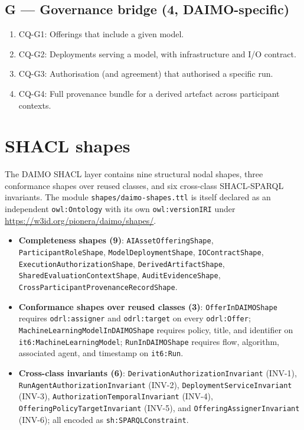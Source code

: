 \documentclass[Afour,sagev,times]{sagej}
\newcommand{\code}[1]{\texttt{#1}}
\newcommand{\cq}[1]{\textsf{#1}}
\begin{document}
\subsection*{G --- Governance bridge (4, DAIMO-specific)}
\begin{enumerate}[label=\arabic*., leftmargin=*]
\item \cq{CQ-G1}: Offerings that include a given model.
\item \cq{CQ-G2}: Deployments serving a model, with infrastructure and I/O contract.
\item \cq{CQ-G3}: Authorisation (and agreement) that authorised a specific run.
\item \cq{CQ-G4}: Full provenance bundle for a derived artefact across participant contexts.
\end{enumerate}

\section{SHACL shapes}\label{app:shapes}

The DAIMO SHACL layer contains nine structural nodal shapes, three conformance shapes over reused classes, and six cross-class SHACL-SPARQL invariants. The module \code{shapes/daimo-shapes.ttl} is itself declared as an independent \code{owl:Ontology} with its own \code{owl:versionIRI} under \url{https://w3id.org/pionera/daimo/shapes/}.

\begin{itemize}[leftmargin=*]
\item \textbf{Completeness shapes (9)}: \code{AIAssetOfferingShape}, \code{ParticipantRoleShape}, \code{ModelDeploymentShape}, \code{IOContractShape}, \code{ExecutionAuthorizationShape}, \code{DerivedArtifactShape}, \code{SharedEvaluationContextShape}, \code{AuditEvidenceShape}, \code{CrossParticipantProvenanceRecordShape}.
\item \textbf{Conformance shapes over reused classes (3)}: \code{OfferInDAIMOShape} requires \code{odrl:assigner} and \code{odrl:target} on every \code{odrl:Offer}; \code{MachineLearningModelInDAIMOShape} requires policy, title, and identifier on \code{it6:MachineLearningModel}; \code{RunInDAIMOShape} requires flow, algorithm, associated agent, and timestamp on \code{it6:Run}.
\item \textbf{Cross-class invariants (6)}: \code{DerivationAuthorizationInvariant} (INV-1), \code{RunAgentAuthorizationInvariant} (INV-2), \code{DeploymentServiceInvariant} (INV-3), \code{AuthorizationTemporalInvariant} (INV-4), \code{OfferingPolicyTargetInvariant} (INV-5), and \code{OfferingAssignerInvariant} (INV-6); all encoded as \code{sh:SPARQLConstraint}.
\end{itemize}
\end{document}
